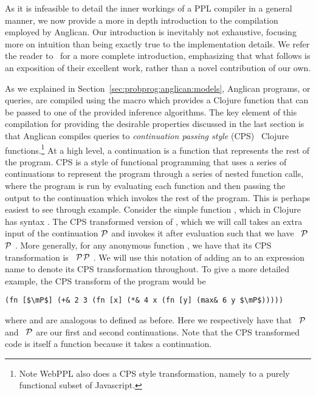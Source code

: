 As it is infeasible to detail the inner workings of a PPL compiler in a general
manner, we now provide a more in depth introduction to the compilation
employed by Anglican.  Our introduction is inevitably not exhaustive, focusing more on
intuition than being exactly true to the implementation details. We refer the reader
to~\citep{tolpin2016design} for a more complete introduction, emphasizing that what
follows is an exposition of their excellent work, rather than a novel contribution of our own.

As we explained in Section~\ref{sec:probprog:anglican:models},
Anglican programs, or queries, are compiled using the macro \query which provides a
Clojure function that can be passed to one of the provided inference algorithms.
The key element of this compilation for providing the desirable properties discussed
in the last section is that
Anglican compiles queries to \emph{continuation passing style} (CPS)~\citep{appel1989continuation}
Clojure functions.\footnote{Note WebPPL also does a CPS style transformation, 
	namely to a purely functional subset of Javascript.}
At a high level, a continuation is a function that represents the rest of the
program.  CPS is a style of functional programming that uses a series of continuations
to represent the program through a series of nested function calls, where the program
is run by evaluating each function and then passing the output to the continuation
which invokes the rest of the program.  This is perhaps easiest to see through
example.  Consider the simple function \clj{+}, which in Clojure has syntax .  The
CPS transformed version of \clj{+}, which we will call \clj{+&} takes an extra input
of the continuation $\mathcal{P}$ and invokes it after evaluation such that we have
\clj{(defn +& [a b } ~$\mathcal{P}$\clj{] (}$\mathcal{P}$ .  More generally, for any anonymous function , we have
that its CPS transformation is \clj{(defn f& [args} ~$\mathcal{P}$\clj{] (}$\mathcal{P}$ .
  We 
will use this notation of adding an \clj{&} to an expression name to denote its CPS transformation throughout.
To give a more detailed example, the CPS transform of the program  would be
\begin{lstlisting}[basicstyle=\ttfamily\small,frame=none]
  (fn [$\mP$] (+& 2 3 (fn [x] (*& 4 x (fn [y] (max& 6 y $\mP$)))))
\end{lstlisting}\vspace{-8pt}
where \clj{*&} and
 are analogous to \clj{+&} defined as before.
Here we respectively have that ~$\mathcal{P}$\clj{))))} and
~$\mathcal{P}$\clj{))} are our first and second continuations.  Note that the CPS 
transformed code is itself a function because it takes a continuation.  

